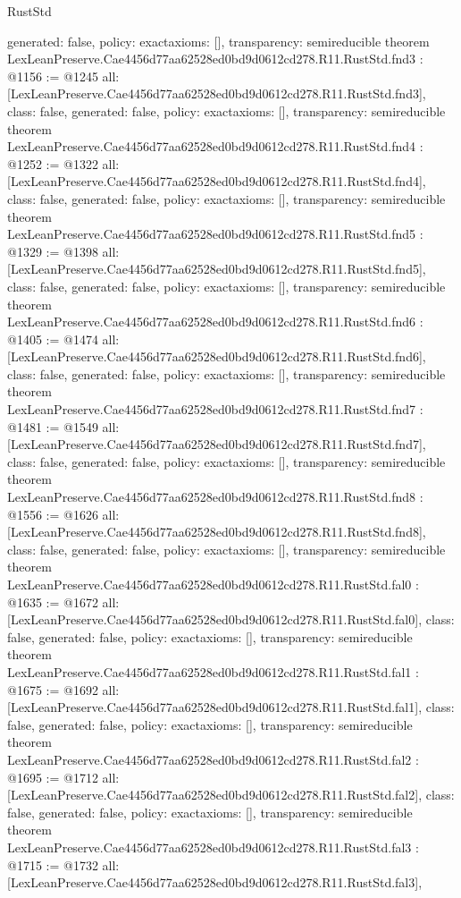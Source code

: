 \begin{lexlean}{RustStd}
\begin{coremodule}
{  generated: false,
  policy: exact{axioms: []},
  transparency: semireducible
}
theorem LexLeanPreserve.Cae4456d77aa62528ed0bd9d0612cd278.R11.RustStd.fnd3 : @1156 := @1245 {
  all: [LexLeanPreserve.Cae4456d77aa62528ed0bd9d0612cd278.R11.RustStd.fnd3],
  class: false,
  generated: false,
  policy: exact{axioms: []},
  transparency: semireducible
}
theorem LexLeanPreserve.Cae4456d77aa62528ed0bd9d0612cd278.R11.RustStd.fnd4 : @1252 := @1322 {
  all: [LexLeanPreserve.Cae4456d77aa62528ed0bd9d0612cd278.R11.RustStd.fnd4],
  class: false,
  generated: false,
  policy: exact{axioms: []},
  transparency: semireducible
}
theorem LexLeanPreserve.Cae4456d77aa62528ed0bd9d0612cd278.R11.RustStd.fnd5 : @1329 := @1398 {
  all: [LexLeanPreserve.Cae4456d77aa62528ed0bd9d0612cd278.R11.RustStd.fnd5],
  class: false,
  generated: false,
  policy: exact{axioms: []},
  transparency: semireducible
}
theorem LexLeanPreserve.Cae4456d77aa62528ed0bd9d0612cd278.R11.RustStd.fnd6 : @1405 := @1474 {
  all: [LexLeanPreserve.Cae4456d77aa62528ed0bd9d0612cd278.R11.RustStd.fnd6],
  class: false,
  generated: false,
  policy: exact{axioms: []},
  transparency: semireducible
}
theorem LexLeanPreserve.Cae4456d77aa62528ed0bd9d0612cd278.R11.RustStd.fnd7 : @1481 := @1549 {
  all: [LexLeanPreserve.Cae4456d77aa62528ed0bd9d0612cd278.R11.RustStd.fnd7],
  class: false,
  generated: false,
  policy: exact{axioms: []},
  transparency: semireducible
}
theorem LexLeanPreserve.Cae4456d77aa62528ed0bd9d0612cd278.R11.RustStd.fnd8 : @1556 := @1626 {
  all: [LexLeanPreserve.Cae4456d77aa62528ed0bd9d0612cd278.R11.RustStd.fnd8],
  class: false,
  generated: false,
  policy: exact{axioms: []},
  transparency: semireducible
}
theorem LexLeanPreserve.Cae4456d77aa62528ed0bd9d0612cd278.R11.RustStd.fal0 : @1635 := @1672 {
  all: [LexLeanPreserve.Cae4456d77aa62528ed0bd9d0612cd278.R11.RustStd.fal0],
  class: false,
  generated: false,
  policy: exact{axioms: []},
  transparency: semireducible
}
theorem LexLeanPreserve.Cae4456d77aa62528ed0bd9d0612cd278.R11.RustStd.fal1 : @1675 := @1692 {
  all: [LexLeanPreserve.Cae4456d77aa62528ed0bd9d0612cd278.R11.RustStd.fal1],
  class: false,
  generated: false,
  policy: exact{axioms: []},
  transparency: semireducible
}
theorem LexLeanPreserve.Cae4456d77aa62528ed0bd9d0612cd278.R11.RustStd.fal2 : @1695 := @1712 {
  all: [LexLeanPreserve.Cae4456d77aa62528ed0bd9d0612cd278.R11.RustStd.fal2],
  class: false,
  generated: false,
  policy: exact{axioms: []},
  transparency: semireducible
}
theorem LexLeanPreserve.Cae4456d77aa62528ed0bd9d0612cd278.R11.RustStd.fal3 : @1715 := @1732 {
  all: [LexLeanPreserve.Cae4456d77aa62528ed0bd9d0612cd278.R11.RustStd.fal3],
}
\end{coremodule}
\end{lexlean}

